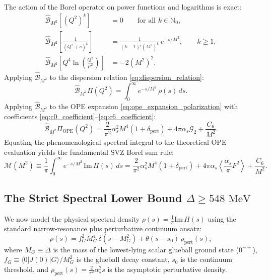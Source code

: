 The action of the Borel operator on power functions and logarithms is exact:
\begin{align}
\hat{\mathcal{B}}_{M^2} \left[ (Q^2)^k \right] &= 0 \qquad \text{for all } k \in \mathbb{N}_0, \label{eq:borel_polynomial_zero} \\
\hat{\mathcal{B}}_{M^2} \left[ \frac{1}{(Q^2 + s)^k} \right] &= \frac{1}{(k - 1)! (M^2)^k} \, e^{-s / M^2}, \qquad k \ge 1, \label{eq:borel_pole} \\
\hat{\mathcal{B}}_{M^2} \left[ Q^4 \ln\left( \frac{Q^2}{\mu^2} \right) \right] &= -2 (M^2)^2. \label{eq:borel_logarithm}
\end{align}
Applying $\hat{\mathcal{B}}_{M^2}$ to the dispersion relation \eqref{eq:dispersion_relation}:
\begin{equation}
\label{eq:borel_dispersion_applied}
\hat{\mathcal{B}}_{M^2} \Pi(Q^2) = \int_0^\infty e^{-s / M^2} \, \rho(s) \, ds.
\end{equation}
Applying $\hat{\mathcal{B}}_{M^2}$ to the OPE expansion \eqref{eq:ope_expansion_polarization} with coefficients \eqref{eq:c0_coefficient}--\eqref{eq:c6_coefficient}:
\begin{equation}
\label{eq:borel_ope_applied}
\hat{\mathcal{B}}_{M^2} \Pi_{\mathrm{OPE}}(Q^2) = \frac{2}{\pi^2} \alpha_s^2 M^4 \left( 1 + \delta_{\mathrm{pert}} \right) + 4 \pi \alpha_s \mathcal{G}_2 + \frac{C_6}{M^2}.
\end{equation}
Equating the phenomenological spectral integral to the theoretical OPE evaluation yields the fundamental SVZ Borel sum rule:
\begin{equation}
\label{eq:borel_sum_rule}
\mathcal{M}(M^2) \equiv \frac{1}{\pi} \int_0^\infty e^{-s / M^2} \, \mathrm{Im} \, \Pi(s) \, ds = \frac{2}{\pi^2} \alpha_s^2 M^4 \left( 1 + \delta_{\mathrm{pert}} \right) + 4 \pi \alpha_s \left\langle \frac{\alpha_s}{\pi} F^2 \right\rangle + \frac{C_6}{M^2}.
\end{equation}

\subsection{The Strict Spectral Lower Bound $\Delta \ge 548\text{ MeV}$}
\label{subsec:spectral_lower_bound_proof}

We now model the physical spectral density $\rho(s) = \frac{1}{\pi} \mathrm{Im} \, \Pi(s)$ using the standard narrow-resonance plus perturbative continuum ansatz:
\begin{equation}
\label{eq:resonance_continuum_model}
\rho(s) = f_G^2 M_G^4 \, \delta(s - M_G^2) + \theta(s - s_0) \, \rho_{\mathrm{pert}}(s),
\end{equation}
where $M_G \equiv \Delta$ is the mass of the lowest-lying scalar glueball ground state ($0^{++}$), $f_G \equiv \langle 0 | J(0) | G \rangle / M_G^2$ is the glueball decay constant, $s_0$ is the continuum threshold, and $\rho_{\mathrm{pert}}(s) = \frac{2}{\pi^2} \alpha_s^2 s$ is the asymptotic perturbative density.

